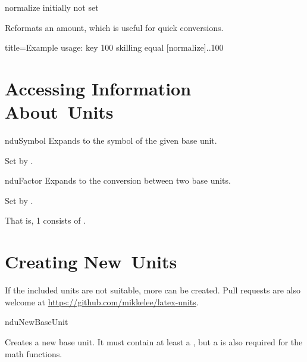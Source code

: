 \documentclass[
	a4paper,
	margin=4cm
]{article}
\begin{document}
\begin{docKey}
	{normalize}
	{}
	{initially not set}

Reformats an amount, which is useful for quick conversions.

\begin{dispExample*}{
	title=Example usage:  key
}
100 skilling equal
[normalize]{..100} %
\end{dispExample*}
\end{docKey}

\clearpage
\section{Accessing Information About Units} %

\begin{docCommand}
	{nduSymbol}
	{}
	Expands to the symbol of the given base unit.
	
	Set by .
\end{docCommand}

\begin{docCommand}
	{nduFactor}
	{}
	Expands to the conversion between two base units.

	Set by .
\begin{dispExample}
That is, 1  consists of
 .
\end{dispExample}
\end{docCommand}

\clearpage
\section{Creating New Units} %

\label{units:new}
If the included units are not suitable, more can be created. Pull requests are also welcome at \url{https://github.com/mikkelee/latex-units}.

\begin{docCommand}
	{nduNewBaseUnit}
	{}
	
Creates a new base unit. It must contain at least a , but a  is also required for the math functions. %

\end{docCommand}
\end{document}
